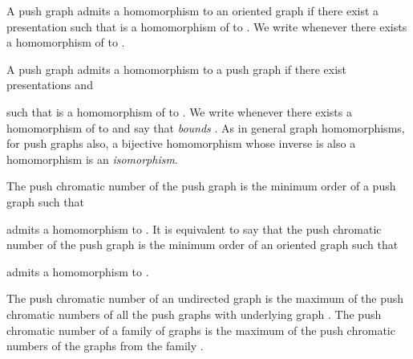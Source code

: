 \documentclass[10pt]{article}
\begin{document}
A push graph  admits a homomorphism  to an oriented graph 
 if there exist  a presentation 
 such that  is a homomorphism of   to 
. We write  whenever there exists a 
 homomorphism of  to .

A push graph  admits a homomorphism  to a push graph 
 if there exist presentations 
 and 
   
such that  is a homomorphism of   to 
. 
 We write  whenever there exists a 
 homomorphism of  to  and say that  \textit{bounds} . 
      As in  general graph homomorphisms, for push graphs also, a bijective homomorphism whose inverse is also a 
     homomorphism is 
     an \textit{isomorphism}. 


The push chromatic number  of the push graph  is the minimum order  of a push graph  such that

admits a homomorphism to .  
It is equivalent to say that the push chromatic number  of the push graph  is the minimum order  of an oriented graph  such that

admits a homomorphism to .  




The push chromatic number  of  an undirected graph 
  is the maximum of the push chromatic numbers of all the push graphs with underlying graph  . The push chromatic number  of  a family  of graphs is the maximum of the push  chromatic numbers of the graphs from the family .
\end{document}
